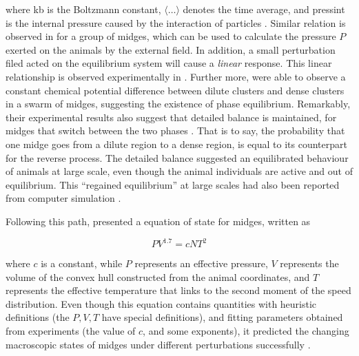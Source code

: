 \documentclass[11pt,twoside]{report}
\begin{document}
\noindent where \gls{kb} is the Boltzmann constant, $\langle \dots \rangle$ denotes the time average, and \gls{pressint} is the internal pressure caused by the interaction of particles \cite{hansen2013ch2, allen2017}. Similar relation is observed in \cite{gorbonos2016} for a group of midges, which can be used to calculate the pressure $P$ exerted on the animals by the external field.
In addition, a small perturbation filed acted on the equilibrium system will cause a \emph{linear} response. This linear relationship is observed experimentally in \cite{ni2015prl}.
Further more, \citeauthor{sinhuber2017} were able to observe a constant chemical potential difference between dilute clusters and dense clusters in a swarm of midges, suggesting the existence of phase equilibrium.
Remarkably, their experimental results also suggest that detailed balance is maintained, for midges that switch between the two phases \cite{sinhuber2017}.
That is to say, the probability that one midge goes from a dilute region to a dense region, is equal to its counterpart for the reverse process. The detailed balance suggested an equilibrated behaviour of animals at large scale, even though the animal individuals are active and out of equilibrium. This ``regained equilibrium'' at large scales had also been reported from computer simulation \cite{egolf2000}.

Following this path, \citeauthor{sinhuber2021} presented a equation of state for midges, written as

\begin{equation}
	PV^{1.7} = c N T^2
\label{eq:eos-midge}
\end{equation}

\noindent where $c$ is a constant, while $P$ represents an effective pressure, $V$ represents the volume of the convex hull constructed from the animal coordinates, and $T$ represents the effective temperature that links to the second moment of the speed distribution.
Even though this equation contains quantities with heuristic definitions (the $P, V, T$ have special definitions), and fitting parameters obtained from experiments (the value of $c$, and some exponents), it  predicted the changing macroscopic states of midges under different perturbations successfully \cite{sinhuber2021}.
\end{document}
